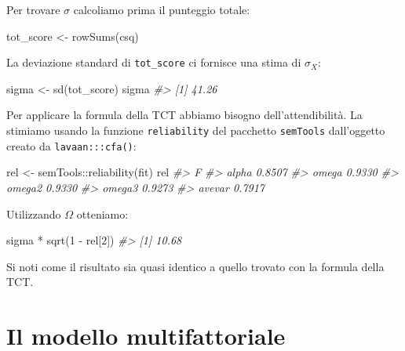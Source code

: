 \documentclass[
  11pt,
]{krantz}
\makeatletter
\newenvironment{Shaded}{\begin{snugshade}}{\end{snugshade}}
\newcommand{\CommentTok}[1]{\textcolor[rgb]{0.37,0.37,0.37}{\textit{#1}}}
\newcommand{\DecValTok}[1]{\textcolor[rgb]{0.06,0.06,0.06}{#1}}
\newcommand{\FunctionTok}[1]{\textcolor[rgb]{0,0,0}{#1}}
\newcommand{\NormalTok}[1]{#1}
\newcommand{\OtherTok}[1]{\textcolor[rgb]{0.37,0.37,0.37}{#1}}
\newcommand{\SpecialCharTok}[1]{\textcolor[rgb]{0,0,0}{#1}}
\newenvironment{kframe}{%
\medskip{}
\setlength{\fboxsep}{.8em}
 \def\at@end@of@kframe{}%
 \ifinner\ifhmode%
  \def\at@end@of@kframe{\end{minipage}}%
  \begin{minipage}{\columnwidth}%
 \fi\fi%
 \def\FrameCommand##1{\hskip\@totalleftmargin \hskip-\fboxsep
 \colorbox{shadecolor}{##1}\hskip-\fboxsep
     \hskip-\linewidth \hskip-\@totalleftmargin \hskip\columnwidth}%
 \MakeFramed {\advance\hsize-\width
   \@totalleftmargin\z@ \linewidth\hsize
   \@setminipage}}%
 {\par\unskip\endMakeFramed%
 \at@end@of@kframe}
\renewenvironment{Shaded}{\begin{kframe}}{\end{kframe}}
\theoremstyle{definition}
\theoremstyle{definition}
\theoremstyle{definition}
\theoremstyle{definition}
\theoremstyle{remark}
\makeatother
\begin{document}
Per trovare \(\sigma\) calcoliamo prima il punteggio totale:

\begin{Shaded}
\begin{Highlighting}[]
\NormalTok{tot\_score }\OtherTok{\textless{}{-}} \FunctionTok{rowSums}\NormalTok{(csq)}
\end{Highlighting}
\end{Shaded}

La deviazione standard di \texttt{tot\_score} ci fornisce una stima di \(\sigma_X\):

\begin{Shaded}
\begin{Highlighting}[]
\NormalTok{sigma }\OtherTok{\textless{}{-}} \FunctionTok{sd}\NormalTok{(tot\_score)}
\NormalTok{sigma}
\CommentTok{\#\textgreater{} [1] 41.26}
\end{Highlighting}
\end{Shaded}

Per applicare la formula della TCT abbiamo bisogno dell'attendibilità. La stimiamo usando la funzione \texttt{reliability} del pacchetto \texttt{semTools} dall'oggetto creato da \texttt{lavaan:::cfa()}:

\begin{Shaded}
\begin{Highlighting}[]
\NormalTok{rel }\OtherTok{\textless{}{-}}\NormalTok{ semTools}\SpecialCharTok{::}\FunctionTok{reliability}\NormalTok{(fit)}
\NormalTok{rel}
\CommentTok{\#\textgreater{}             F}
\CommentTok{\#\textgreater{} alpha  0.8507}
\CommentTok{\#\textgreater{} omega  0.9330}
\CommentTok{\#\textgreater{} omega2 0.9330}
\CommentTok{\#\textgreater{} omega3 0.9273}
\CommentTok{\#\textgreater{} avevar 0.7917}
\end{Highlighting}
\end{Shaded}

Utilizzando \(\Omega\) otteniamo:

\begin{Shaded}
\begin{Highlighting}[]
\NormalTok{sigma }\SpecialCharTok{*} \FunctionTok{sqrt}\NormalTok{(}\DecValTok{1} \SpecialCharTok{{-}}\NormalTok{ rel[}\DecValTok{2}\NormalTok{])}
\CommentTok{\#\textgreater{} [1] 10.68}
\end{Highlighting}
\end{Shaded}

Si noti come il risultato sia quasi identico a quello trovato con la formula della TCT.

\hypertarget{ch:mod_multifattoriale}{%
\chapter{Il modello multifattoriale}\label{ch:mod_multifattoriale}}
\end{document}
